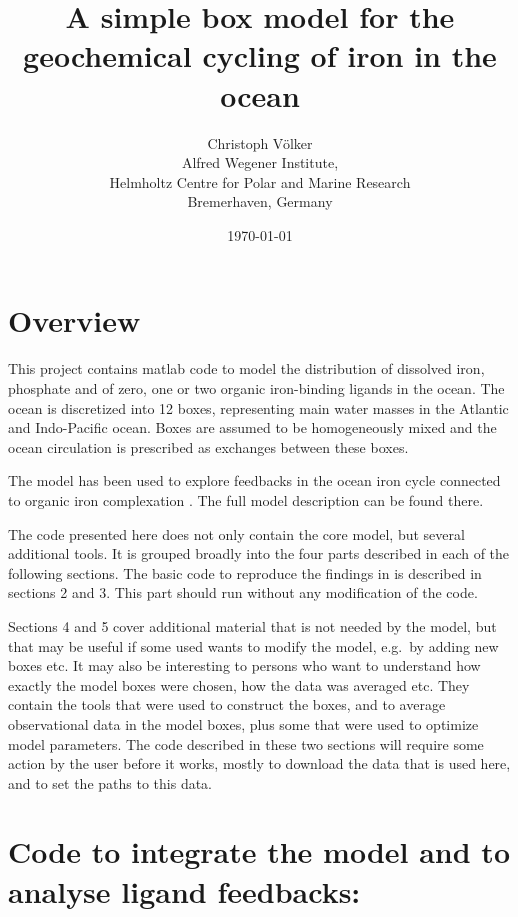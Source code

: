 \documentclass[a4paper,titlepage=false]{scrartcl}
\begin{document}
\title{A simple box model for the geochemical cycling of iron in the ocean}

\author{Christoph V\"olker \\
  Alfred Wegener Institute, \\
  Helmholtz Centre for Polar and Marine Research \\
  Bremerhaven, Germany}
\date{\today}

\maketitle

\section{Overview}

This project contains matlab code to model the distribution of dissolved iron, 
phosphate and of zero, one or two organic iron-binding ligands in the ocean. 
The ocean is discretized into 12 boxes, representing main water masses in the
Atlantic and Indo-Pacific ocean. Boxes are assumed to be homogeneously mixed
and the ocean circulation is prescribed as exchanges between these boxes.

The model has been used to explore feedbacks in the ocean iron cycle
connected to organic iron complexation \citep{Voelker21}. The full
model description can be found there.

The code presented here does not only contain the core model, but
several additional tools. It is grouped broadly into the four parts
described in each of the following sections. The basic code to
reproduce the findings in \citet{Voelker21} is described in sections 2
and 3. This part should run without any modification of the
code. 

Sections 4 and 5 cover additional material that is not needed by the
model, but that may be useful if some used wants to modify the model,
e.g.\ by adding new boxes etc. It may also be interesting to persons
who want to understand how exactly the model boxes were chosen, how
the data was averaged etc. They contain the tools that were used to
construct the boxes, and to average observational data in the model
boxes, plus some that were used to optimize model parameters. The code
described in these two sections will require some action by the user
before it works, mostly to download the data that is used here, and to
set the paths to this data.

\section{Code to integrate the model and to analyse ligand
  feedbacks:}
\end{document}
